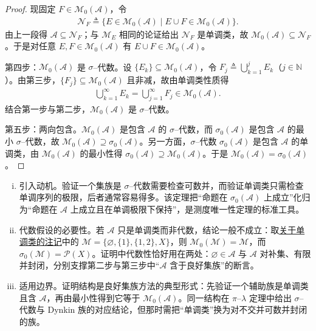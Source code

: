 \documentclass[../../main.tex]{subfiles}%
\begin{document}
\begin{proof}
现固定 $F\in\mathcal{M}_0(\mathcal{A})$，令
\begin{align*}
\mathcal{N}_F\triangleq\{E\in\mathcal{M}_0(\mathcal{A})\mid E\cup F\in\mathcal{M}_0(\mathcal{A})\}.
\end{align*}
由上一段得 $\mathcal{A}\subseteq\mathcal{N}_F$；与 $\mathcal{M}_E$ 相同的论证给出 $\mathcal{N}_F$ 是单调类，故 $\mathcal{M}_0(\mathcal{A})\subseteq\mathcal{N}_F$。于是对任意 $E,F\in\mathcal{M}_0(\mathcal{A})$ 有 $E\cup F\in\mathcal{M}_0(\mathcal{A})$。

第四步：$\mathcal{M}_0(\mathcal{A})$ 是 $\sigma$--代数。设 $\{E_k\}\subseteq\mathcal{M}_0(\mathcal{A})$，令 $F_j\triangleq\bigcup_{k=1}^jE_k$（$j\in\mathbb{N}$）。由第三步，$\{F_j\}\subseteq\mathcal{M}_0(\mathcal{A})$ 且非减，故由单调类性质得
\begin{align*}
\bigcup_{k=1}^\infty E_k=\bigcup_{j=1}^\infty F_j\in\mathcal{M}_0(\mathcal{A}).
\end{align*}
结合第一步与第二步，$\mathcal{M}_0(\mathcal{A})$ 是 $\sigma$--代数。

第五步：两向包含。$\mathcal{M}_0(\mathcal{A})$ 是包含 $\mathcal{A}$ 的 $\sigma$--代数，而 $\sigma_0(\mathcal{A})$ 是包含 $\mathcal{A}$ 的最小 $\sigma$--代数，故 $\mathcal{M}_0(\mathcal{A})\supseteq\sigma_0(\mathcal{A})$。另一方面，$\sigma$--代数 $\sigma_0(\mathcal{A})$ 是包含 $\mathcal{A}$ 的单调类，由 $\mathcal{M}_0(\mathcal{A})$ 的最小性得 $\sigma_0(\mathcal{A})\supseteq\mathcal{M}_0(\mathcal{A})$。于是 $\mathcal{M}_0(\mathcal{A})=\sigma_0(\mathcal{A})$。
\end{proof}

\begin{remark}\label{remark:ch01-单调类定理}
\begin{enumerate}[(i)]
\item 引入动机。验证一个集族是 $\sigma$--代数需要检查可数并，而验证单调类只需检查单调序列的极限，后者通常容易得多。该定理把“命题在 $\sigma_0(\mathcal{A})$ 上成立”化归为“命题在 $\mathcal{A}$ 上成立且在单调极限下保持”，是测度唯一性定理的标准工具。
\item 代数假设的必要性。若 $\mathcal{A}$ 只是单调类而非代数，结论一般不成立：取\hyperref[remark:ch01-单调类]{关于单调类的注记}中的 $\mathcal{M}=\{\varnothing,\{1\},\{1,2\},X\}$，则 $\mathcal{M}_0(\mathcal{M})=\mathcal{M}$，而 $\sigma_0(\mathcal{M})=\mathcal{P}(X)$。证明中代数性恰好用在两处：$\varnothing\in\mathcal{A}$ 与 $\mathcal{A}$ 对补集、有限并封闭，分别支撑第二步与第三步中“$\mathcal{A}$ 含于良好集族”的断言。
\item 适用边界。证明结构是良好集族方法的典型形式：先验证一个辅助族是单调类且含 $\mathcal{A}$，再由最小性得到它等于 $\mathcal{M}_0(\mathcal{A})$。同一结构在 $\pi$--$\lambda$ 定理中给出 $\sigma$--代数与 Dynkin 族的对应结论，但那时需把“单调类”换为对不交并可数并封闭的族。
\end{enumerate}
\end{remark}
\end{document}
